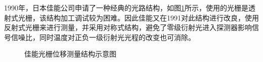 \documentclass[type=master,oneside]{fduthesis}
\begin{document}
1990年，日本佳能公司\cite{ishii1990optical,nishimura1991encoder,ishizuka1992encoder}申请了一种经典的光路结构，如图\ref{fig:佳能光栅位移测量结构示意图}所示，使用的光栅是透射式光栅，该结构加工调试较为困难。因此佳能又在1991对此结构进行改良，使用反射式光栅来进行测量，并采用对称式结构，避免了零级衍射光进入探测器影响信号信噪比，同时温度对正负一级衍射光光程的改变也可消除。
\begin{figure}[htb]
  \centering
  \caption{佳能光栅位移测量结构示意图}
  \label{fig:佳能光栅位移测量结构示意图}
\end{figure}
\end{document}
